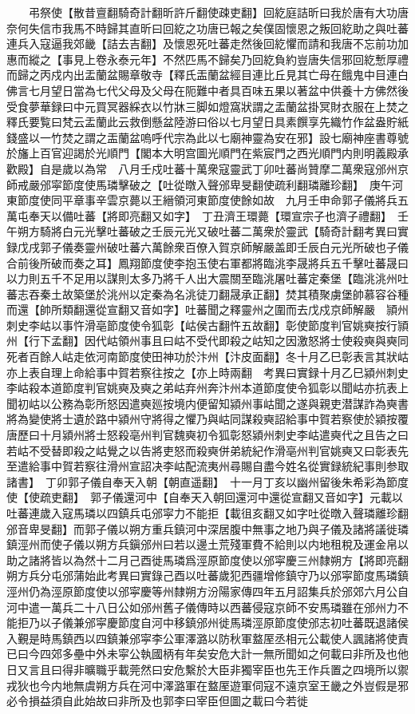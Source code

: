 　　弔祭使【散昔亶翻騎奇計翻昕許斤翻使疎吏翻】回紇庭詰昕曰我於唐有大功唐奈何失信市我馬不時歸其直昕曰回紇之功唐已報之矣僕固懷恩之叛回紇助之與吐蕃連兵入寇逼我郊畿【詰去吉翻】及懷恩死吐蕃走然後回紇懼而請和我唐不忘前功加惠而縱之【事見上卷永泰元年】不然匹馬不歸矣乃回紇負約豈唐失信邪回紇慙厚禮而歸之丙戍内出盂蘭盆賜章敬寺【釋氏㿻蘭盆經目連比丘見其亡母在餓鬼中目連白佛言七月望日當為七代父母及父母在阨難中者具百味五果以著盆中供養十方佛然後受食夢華録曰中元買冥器綵衣以竹牀三脚如燈窩狀謂之盂蘭盆掛冥財衣服在上焚之釋氏要覧曰梵云盂蘭此云救倒懸盆陸游曰俗以七月望日具素饌享先織竹作盆盎貯紙錢盛以一竹焚之謂之㿻蘭盆嗚呼代宗為此以七廟神靈為安在邪】設七廟神座書尊號於旛上百官迎謁於光順門【閣本大明宫圖光順門在紫宸門之西光順門内則明義殿承歡殿】自是歲以為常　八月壬戍吐蕃十萬衆寇靈武丁卯吐蕃尚贊摩二萬衆寇邠州京師戒嚴邠寜節度使馬璘擊破之【吐從暾入聲邠卑旻翻使疏利翻璘離珍翻】　庚午河東節度使同平章事辛雲京薨以王縉領河東節度使餘如故　九月壬申命郭子儀將兵五萬屯奉天以備吐蕃【將即亮翻又如字】　丁丑濟王環薨【環宣宗子也濟子禮翻】　壬午朔方騎將白元光擊吐蕃破之壬辰元光又破吐蕃二萬衆於靈武【騎奇計翻考異曰實録戊戌郭子儀奏靈州破吐蕃六萬餘衆百僚入賀京師解嚴盖即壬辰白元光所破也子儀合前後所破而奏之耳】鳳翔節度使李抱玉使右軍都將臨洮李晟將兵五千擊吐蕃晟曰以力則五千不足用以謀則太多乃將千人出大震關至臨洮屠吐蕃定秦堡【臨洮洮州吐蕃志吞秦土故築堡於洮州以定秦為名洮徒刀翻晟承正翻】焚其積聚虜堡帥慕容谷種而還【帥所類翻還從宣翻又音如字】吐蕃聞之釋靈州之圍而去戊戍京師解嚴　頴州刺史李岵以事忤滑亳節度使令狐彰【岵侯古翻忤五故翻】彰使節度判官姚奭按行頴州【行下孟翻】因代岵領州事且曰岵不受代即殺之岵知之因激怒將士使殺奭與奭同死者百餘人岵走依河南節度使田神功於汴州【汴皮面翻】冬十月乙巳彰表言其狀岵亦上表自理上命給事中賀若察往按之【亦上時兩翻　考異曰實録十月乙巳潁州刺史李岵殺本道節度判官姚奭及奭之弟岵弃州奔汴州本道節度使令狐彰以聞岵亦抗表上聞初岵以公務為彰所怒因遣奭廵按境内便留知潁州事岵聞之遂與親吏潜謀詐為奭書將為變使將士遺於路中潁州守將得之懼乃與岵同謀殺奭詔給事中賀若察使於潁按覆唐歷曰十月潁州將士怒殺亳州判官魏奭初令狐彰怒潁州刺史李岵遣奭代之且告之曰若岵不受替即殺之岵覺之以告將吏怒而殺奭併弟統紀作滑亳州判官姚奭又曰彰表先至遣給事中賀若察往滑州宣詔决李岵配流夷州尋賜自盡今姓名從實録統紀事則参取諸書】　丁卯郭子儀自奉天入朝【朝直遥翻】　十一月丁亥以幽州留後朱希彩為節度使【使疏吏翻】　郭子儀還河中【自奉天入朝回還河中還從宣翻又音如字】元載以吐蕃連歲入寇馬璘以四鎮兵屯邠寜力不能拒【載徂亥翻又如字吐從暾入聲璘離珍翻邠音卑旻翻】而郭子儀以朔方重兵鎮河中深居腹中無事之地乃與子儀及諸將議徙璘鎮涇州而使子儀以朔方兵鎭邠州曰若以邊土荒殘軍費不給則以内地租稅及運金帛以助之諸將皆以為然十二月己酉徙馬璘爲涇原節度使以邠寜慶三州隸朔方【將即亮翻朔方兵分屯邠蒲始此考異曰實錄己酉以吐蕃歲犯西疆增修鎮守乃以邠寜節度馬璘鎮涇州仍為涇原節度使以邠寜慶等州隸朔方汾陽家傳四年五月詔集兵於邠郊六月公自河中遣一萬兵二十八日公如邠州舊子儀傳時以西蕃侵寇京師不安馬璘雖在邠州力不能拒乃以子儀兼邠寜慶節度自河中移鎮邠州徙馬璘涇原節度使邠志初吐蕃既退諸侯入覲是時馬鎮西以四鎮兼邠寜李公軍澤潞以防秋軍盩厔丞相元公載使人諷諸將使責已曰今四郊多壘中外未寜公執國柄有年矣安危大計一無所聞如之何載曰非所及也他日又言且曰得非曠職乎載莞然曰安危繫於大臣非獨宰臣也先王作兵置之四境所以禦戎狄也今内地無虞朔方兵在河中澤潞軍在盩厔遊軍伺寇不遠京室王畿之外豈假是邪必令損益須自此始故曰非所及也郭李曰宰臣但圖之載曰今若徙